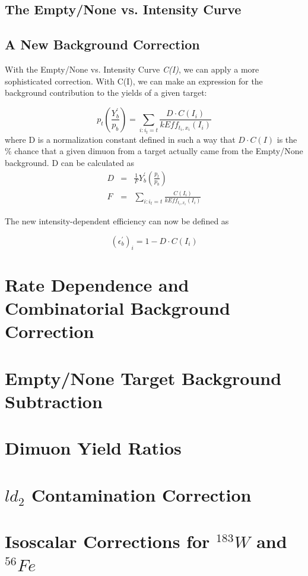 \subsection{The Empty/None vs. Intensity Curve}


\subsection{A New Background Correction}

With the Empty/None vs. Intensity Curve \emph{C(I)}, we can apply a more sophisticated correction. With C(I), we can make an expression for the background contribution to the yields of a given target:

\begin{equation}
p_t \left( \frac{Y^\prime_b}{p_b} \right) = \sum_{i:i_t=t} \frac{D\cdot C(I_i)}{kEff_{t_i, x_i}(I_i)}
\end{equation}
where D is a normalization constant defined in such a way that $D \cdot C(I)$ is the \% chance that a given dimuon from a target actually came from the Empty/None background. D can be calculated as
\begin{eqnarray}
D & = & \frac{1}{F} Y^\prime_b \left( \frac{p_t}{p_b} \right) \\
F & = &\sum_{i: i_t=t} \frac{C(I_i)}{kEff_{t_i, x_i}(I_i)}
\end{eqnarray}

The new intensity-dependent efficiency can now be defined as

\begin{equation}
(\epsilon_b^\prime)_i = 1 - D \cdot C(I_i)
\end{equation}

\section{Rate Dependence and Combinatorial Background Correction}



\section{Empty/None Target Background Subtraction}



\section{Dimuon Yield Ratios}



\section{$ld_2$ Contamination Correction}



\section{Isoscalar Corrections for $^{183}W$ and $^{56}Fe$}


